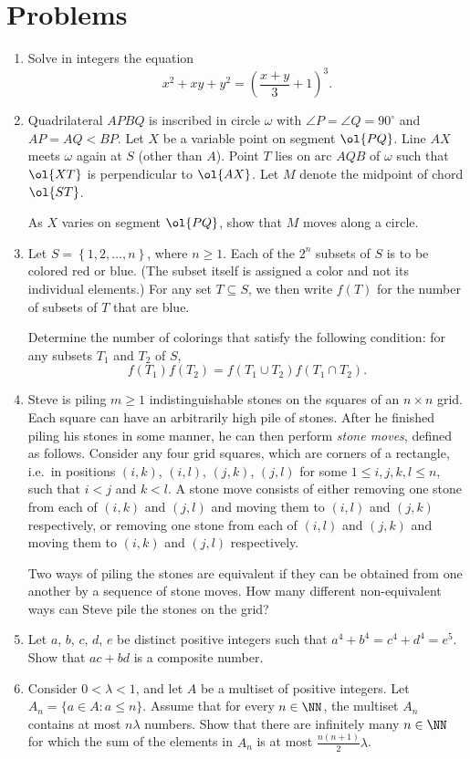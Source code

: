 \documentclass[11pt]{scrartcl}
\begin{document}
\section{Problems}
\begin{enumerate}[\bfseries 1.]
\item %
Solve in integers the equation
\[ x^2+xy+y^2 = \left(\frac{x+y}{3}+1\right)^3. \]

\item %
Quadrilateral $APBQ$ is inscribed in circle $\omega$ with
$\angle P = \angle Q = 90^{\circ}$ and $AP = AQ < BP$.
Let $X$ be a variable point on segment $\ol{PQ}$.
Line $AX$ meets $\omega$ again at $S$ (other than $A$).
Point $T$ lies on arc $AQB$ of $\omega$ such that $\ol{XT}$
is perpendicular to $\ol{AX}$.
Let $M$ denote the midpoint of chord $\ol{ST}$.

As $X$ varies on segment $\ol{PQ}$, show that $M$ moves along a circle.

\item %
Let $S = \left\{ 1,2,\dots,n \right\}$, where $n \ge 1$.
Each of the $2^n$ subsets of $S$ is to be colored red or blue.
(The subset itself is assigned a color and not its individual elements.)
For any set $T \subseteq S$,
we then write $f(T)$ for the number of subsets of $T$ that are blue.

Determine the number of colorings that satisfy the following condition:
for any subsets $T_1$ and $T_2$ of $S$,
\[ f(T_1)f(T_2) = f(T_1 \cup T_2)f(T_1 \cap T_2). \]

\item %
Steve is piling $m\geq 1$ indistinguishable stones
on the squares of an $n\times n$ grid.
Each square can have an arbitrarily high pile of stones.
After he finished piling his stones in some manner,
he can then perform \emph{stone moves}, defined as follows.
Consider any four grid squares, which are corners of a rectangle,
i.e.\ in positions $(i, k)$, $(i, l)$, $(j, k)$, $(j, l)$
for some $1\leq i, j, k, l\leq n$, such that $i<j$ and $k<l$.
A stone move consists of either removing one stone from each of
$(i, k)$ and $(j, l)$ and moving them to $(i, l)$ and $(j, k)$ respectively,
or removing one stone from each of $(i, l)$ and $(j, k)$
and moving them to $(i, k)$ and $(j, l)$ respectively.

Two ways of piling the stones are equivalent if they can be obtained
from one another by a sequence of stone moves.
How many different non-equivalent ways can Steve pile the stones on the grid?

\item %
Let $a$, $b$, $c$, $d$, $e$ be distinct positive integers
such that $a^4+b^4=c^4+d^4=e^5$.
Show that $ac+bd$ is a composite number.

\item %
Consider $0<\lambda<1$, and let $A$ be a multiset of positive integers.
Let $A_n=\{a\in A: a\leq n\}$.
Assume that for every $n\in\NN$,
the multiset $A_n$ contains at most $n\lambda$ numbers.
Show that there are infinitely many $n\in\NN$ for
which the sum of the elements in $A_n$ is
at most $\frac{n(n+1)}{2}\lambda$.

\end{enumerate}
\pagebreak
\end{document}
